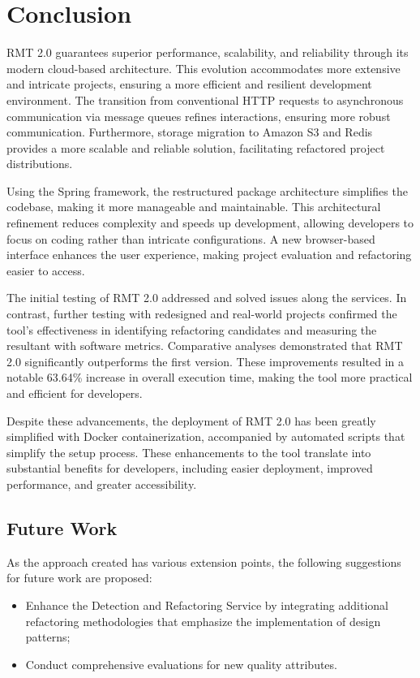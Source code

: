 \chapter{Conclusion}%
\label{conclusion}

RMT 2.0 guarantees superior performance, scalability, and reliability through its modern cloud-based architecture. This evolution accommodates more extensive and intricate projects, ensuring a more efficient and resilient development environment. The transition from conventional HTTP requests to asynchronous communication via message queues refines interactions, ensuring more robust communication. Furthermore, storage migration to Amazon S3 and Redis provides a more scalable and reliable solution, facilitating refactored project distributions.

Using the Spring framework, the restructured package architecture simplifies the codebase, making it more manageable and maintainable. This architectural refinement reduces complexity and speeds up development, allowing developers to focus on coding rather than intricate configurations. A new browser-based interface enhances the user experience, making project evaluation and refactoring easier to access.

The initial testing of RMT 2.0 addressed and solved issues along the services. In contrast, further testing with redesigned and real-world projects confirmed the tool's effectiveness in identifying refactoring candidates and measuring the resultant with software metrics. Comparative analyses demonstrated that RMT 2.0 significantly outperforms the first version. These improvements resulted in a notable 63.64\% increase in overall execution time, making the tool more practical and efficient for developers.

Despite these advancements, the deployment of RMT 2.0 has been greatly simplified with Docker containerization, accompanied by automated scripts that simplify the setup process. These enhancements to the tool translate into substantial benefits for developers, including easier deployment, improved performance, and greater accessibility.

\section{Future Work}

As the approach created has various extension points, the following suggestions for future work are proposed:
\begin{itemize}
  \item Enhance the Detection and Refactoring Service by integrating additional refactoring methodologies that emphasize the implementation of design patterns; 
    \item Conduct comprehensive evaluations for new quality attributes.
\end{itemize}

